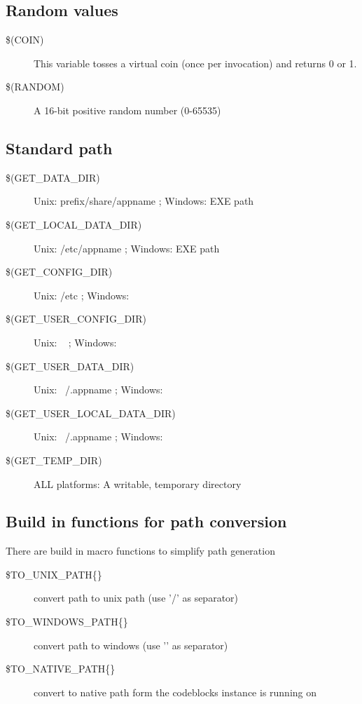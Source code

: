 \subsection{Random values}

\begin{description}
\item[{\footnotesize \$(COIN)}] This variable tosses a virtual coin (once per invocation) and returns 0 or 1.
\item[{\footnotesize \$(RANDOM)}] A 16-bit positive random number (0-65535)
\end{description}

\subsection{Standard path}

\begin{description}
\item[{\footnotesize \$(GET\_DATA\_DIR)}] Unix: prefix/share/appname ; Windows: EXE path
\item[{\footnotesize \$(GET\_LOCAL\_DATA\_DIR)}] Unix: /etc/appname ; Windows: EXE path
\item[{\footnotesize \$(GET\_CONFIG\_DIR)}] Unix: /etc ; Windows: 
\item[{\footnotesize \$(GET\_USER\_CONFIG\_DIR)}] Unix: ~ ; Windows: 
\item[{\footnotesize \$(GET\_USER\_DATA\_DIR)}] Unix: ~/.appname ; Windows: 
\item[{\footnotesize \$(GET\_USER\_LOCAL\_DATA\_DIR)}] Unix: ~/.appname ; Windows: 
\item[{\footnotesize \$(GET\_TEMP\_DIR)}] ALL platforms: A writable, temporary directory
\end{description}

\subsection{Build in functions for path conversion}
There are build in macro functions to simplify path generation 
\begin{description}
\item[{\footnotesize \$TO\_UNIX\_PATH\{\}}] convert path to unix path (use '/' as separator)
\item[{\footnotesize \$TO\_WINDOWS\_PATH\{\}}] convert path to windows (use '\osp' as separator)
\item[{\footnotesize \$TO\_NATIVE\_PATH\{\}}] convert to native path form the codeblocks instance is running on
\end{description}


